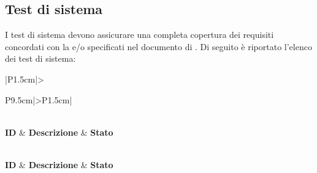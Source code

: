 \subsection{Test di sistema}

\par I test di sistema devono assicurare una completa copertura dei requisiti concordati con la  e/o specificati nel documento di \AdR. Di seguito è riportato l'elenco dei test di sistema:

\bgroup
\begin{adjustwidth}{-0.5cm}{-0.5cm}
 	\begin{longtable}{|P{1.5cm}|>{\raggedright}P{9.5cm}|>{\arraybackslash}P{1.5cm}|}
		\caption{Test di sistema}
  	\label{tab:test-sistema} \\
	  \hline
		\textbf{ID} & \textbf{Descrizione} & \textbf{Stato} \\ 
		\hline
		\endfirsthead

		\caption[]{Test di sistema (continua)} \\
		\hline
		\textbf{ID} & \textbf{Descrizione} & \textbf{Stato} \\ 
		\hline
		\endhead

		\hline
		 \\ 
		\hline
		\endfoot

		\hline
		\endlastfoot


\end{longtable}
\end{adjustwidth}

